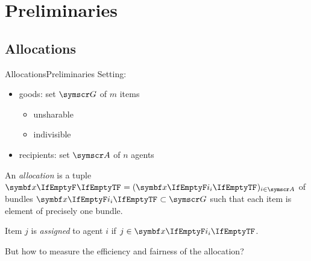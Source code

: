 \section{Preliminaries}

\subsection{Allocations}
\begin{frame}{Allocations}{Preliminaries}
	Setting:
	\begin{itemize}
		\item
		goods: set \(\goods\) of \(m\) items
		\begin{itemize}
			\item
			unsharable

			\item
			indivisible
		\end{itemize}

		\item
		recipients: set \(\agents\) of \(n\) agents
	\end{itemize}
	\begin{definition}
		An \emph{allocation} is a tuple
		\(\alloc[][] = (\alloc)_{i \in \agents}\)
		of bundles \(\alloc \subset \goods\) such that each item is element of precisely one bundle.

		Item \(j\) is \emph{assigned} to agent \(i\) if \(j \in \alloc\).
	\end{definition}

	But how to measure the efficiency and fairness of the allocation?
\end{frame}

